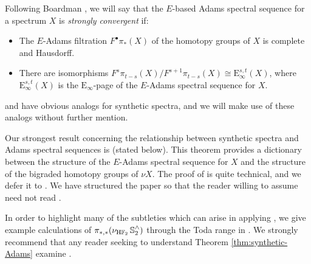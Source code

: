 \begin{dfn} \label{dfn:strong-conv}
    Following Boardman \cite[Defintion 5.2]{Boardman}, we will say that the $E$-based Adams spectral sequence for a spectrum $X$ is \emph{strongly convergent} if:
    \begin{itemize}
        \item The $E$-Adams filtration $F^{\bullet} \pi_{*} (X)$ of the homotopy groups of $X$ is complete and Hausdorff.
        \item There are isomorphisms $F^{s} \pi_{t-s} (X) / F^{s+1} \pi_{t-s} (X) \cong \mathrm{E}^{s,t}_\infty (X)$, where $\mathrm{E}_{\infty} ^{s,t} (X)$ is the $\mathrm{E}_\infty$-page of the $E$-Adams spectral sequence for $X$.
    \end{itemize}
\end{dfn}


\begin{rmk}
     and  have obvious analogs for synthetic spectra, and we will make use of these analogs without further mention.
\end{rmk}

Our strongest result concerning the relationship between synthetic spectra and Adams spectral sequences is  (stated below). This theorem provides a dictionary between the structure of the $E$-Adams spectral sequence for $X$ and the structure of the bigraded homotopy groups of $\nu X$. The proof of  is quite technical, and we defer it to . We have structured the paper so that the reader willing to assume  need not read .

In order to highlight many of the subtleties which can arise in applying , we give example calculations of $\pi_{*,*}(\nu_{\mathrm{H}\mathbb{F}_2} \operatorname{\mathbb{S}}_2^\wedge)$ through the Toda range in .  We strongly recommend that any reader seeking to understand Theorem \ref{thm:synthetic-Adams} examine .

